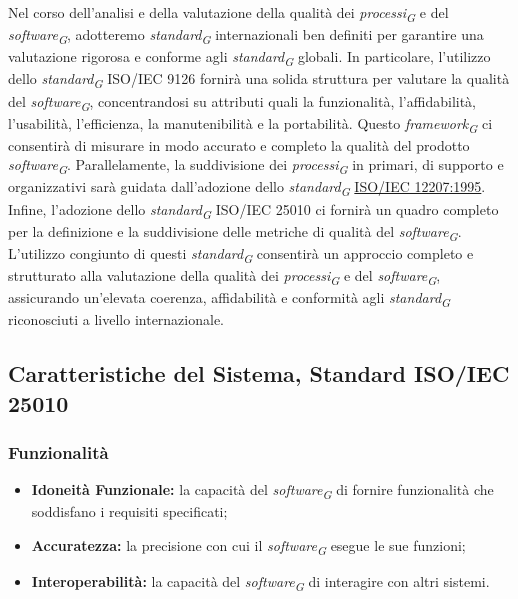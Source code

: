 Nel corso dell'analisi e della valutazione della qualità dei \textit{processi}\textsubscript{\textit{G}} e del \textit{software}\textsubscript{\textit{G}}, adotteremo \textit{standard}\textsubscript{\textit{G}} internazionali ben definiti per garantire una valutazione rigorosa e conforme agli \textit{standard}\textsubscript{\textit{G}} globali. In particolare, l'utilizzo dello \textit{standard}\textsubscript{\textit{G}} ISO/IEC 9126 fornirà una solida struttura per valutare la qualità del \textit{software}\textsubscript{\textit{G}}, concentrandosi su attributi quali la funzionalità, l'affidabilità, l'usabilità, l'efficienza, la manutenibilità e la portabilità. Questo \textit{framework}\textsubscript{\textit{G}} ci consentirà di misurare in modo accurato e completo la qualità del prodotto \textit{software}\textsubscript{\textit{G}}. Parallelamente, la suddivisione dei \textit{processi}\textsubscript{\textit{G}} in primari, di supporto e organizzativi sarà guidata dall'adozione dello \textit{standard}\textsubscript{\textit{G}} \href{https://www.math.unipd.it/~tullio/IS-1/2009/Approfondimenti/ISO_12207-1995.pdf}{ISO/IEC 12207:1995}. Infine, l'adozione dello \textit{standard}\textsubscript{\textit{G}} ISO/IEC 25010 ci fornirà un quadro completo per la definizione e la suddivisione delle metriche di qualità del \textit{software}\textsubscript{\textit{G}}.
L'utilizzo congiunto di questi \textit{standard}\textsubscript{\textit{G}} consentirà un approccio completo e strutturato alla valutazione della qualità dei \textit{processi}\textsubscript{\textit{G}} e del \textit{software}\textsubscript{\textit{G}}, assicurando un'elevata coerenza, affidabilità e conformità agli \textit{standard}\textsubscript{\textit{G}} riconosciuti a livello internazionale.

\subsection{Caratteristiche del Sistema, Standard ISO/IEC 25010}

\subsubsection{Funzionalità}
\begin{itemize}
    \item \textbf{Idoneità Funzionale:} la capacità del \textit{software}\textsubscript{\textit{G}} di fornire funzionalità che soddisfano i requisiti specificati;
    \item \textbf{Accuratezza:} la precisione con cui il \textit{software}\textsubscript{\textit{G}} esegue le sue funzioni;
    \item \textbf{Interoperabilità:} la capacità del \textit{software}\textsubscript{\textit{G}} di interagire con altri sistemi.
\end{itemize}

